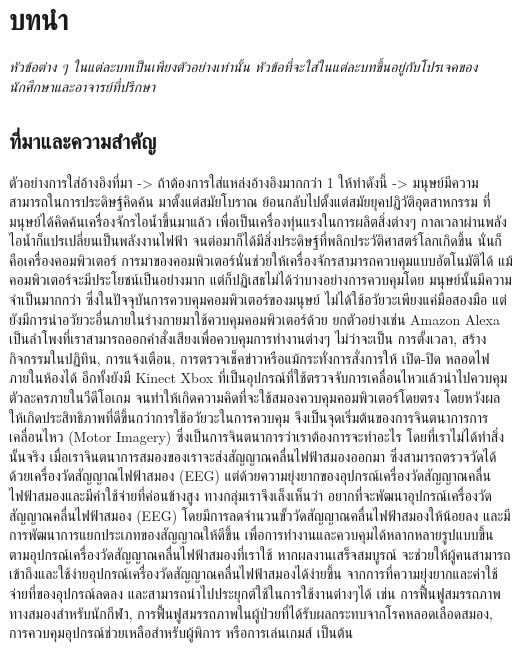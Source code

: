 \documentclass[12pt,oneside,openright,a4paper]{cpe-thai-project}
\begin{document}



\chapter{บทนำ}

\emph{หัวข้อต่าง ๆ ในแต่ละบทเป็นเพียงตัวอย่างเท่านั้น หัวข้อที่จะใส่ในแต่ละบทขึ้นอยู่กับโปรเจคของนักศึกษาและอาจารย์ที่ปรึกษา}

\section{ที่มาและความสำคัญ}

ตัวอย่างการใส่อ้างอิงที่มา -> \cite{hypersense} ถ้าต้องการใส่แหล่งอ้างอิงมากกว่า 1 ให้ทำดังนี้ -> \cite{hypersense,bworld} มนุษย์มีความสามารถในการประดิษฐ์คิดค้น มาตั้งแต่สมัยโบราณ ย้อนกลับไปตั้งแต่สมัยยุคปฏิวัติอุตสาหกรรม ที่มนุษย์ได้คิดค้นเครื่องจักรไอน้ำขึ้นมาแล้ว เพื่อเป็นเครื่องทุ่นแรงในการผลิตสิ่งต่างๆ กาลเวลาผ่านพลังไอน้ำก็แปรเปลี่ยนเป็นพลังงานไฟฟ้า จนต่อมาก็ได้มีสิ่งประดิษฐ์ที่พลิกประวัติศาสตร์โลกเกิดขึ้น นั่นก็คือเครื่องคอมพิวเตอร์ การมาของคอมพิวเตอร์นั่นช่วยให้เครื่องจักรสามารถควบคุมแบบอัตโนมัติได้ แม้คอมพิวเตอร์จะมีประโยชน์เป็นอย่างมาก แต่ก็ปฏิเสธไม่ได้ว่าบางอย่างการควบคุมโดย มนุษย์นั้นมีความจำเป็นมากกว่า ซึ่งในปัจจุบันการควบคุมคอมพิวเตอร์ของมนุษย์ ไม่ได้ใช้อวัยวะเพียงแค่มือสองมือ แต่ยังมีการนำอวัยวะอื่นภายในร่างกายมาใช้ควบคุมคอมพิวเตอร์ด้วย ยกตัวอย่างเช่น Amazon Alexa เป็นลำโพงที่เราสามารถออกคำสั่งเสียงเพื่อควบคุมการทำงานต่างๆ ไม่ว่าจะเป็น การตั้งเวลา, สร้างกิจกรรมในปฏิทิน, การแจ้งเตือน, การตรวจเช็คข่าวหรือแม้กระทั่งการสั่งการให้ เปิด-ปิด หลอดไฟภายในห้องได้ อีกทั้งยังมี Kinect Xbox ที่เป็นอุปกรณ์ที่ใช้ตรวจจับการเคลื่อนไหวแล้วนำไปควบคุมตัวละครภายในวีดีโอเกม จนทำให้เกิดความคิดที่จะใช้สมองควบคุมคอมพิวเตอร์โดยตรง โดยหวังผลให้เกิดประสิทธิภาพที่ดีขึ้นกว่าการใช้อวัยวะในการควบคุม จึงเป็นจุดเริ่มต้นของการจินตนาการการเคลื่อนไหว (Motor Imagery) ซึ่งเป็นการจินตนาการว่าเราต้องการจะทำอะไร โดยที่เราไม่ได้ทำสิ่งนั้นจริง เมื่อเราจินตนาการสมองของเราจะส่งสัญญาณคลื่นไฟฟ้าสมองออกมา ซึ่งสามารถตรวจวัดได้ด้วยเครื่องวัดสัญญาณไฟฟ้าสมอง (EEG)
แต่ด้วยความยุ่งยากของอุปกรณ์เครื่องวัดสัญญาณคลื่นไฟฟ้าสมองและมีค่าใช้จ่ายที่ค่อนข้างสูง ทางกลุ่มเราจึงเล็งเห็นว่า อยากที่จะพัฒนาอุปกรณ์เครื่องวัดสัญญาณคลื่นไฟฟ้าสมอง (EEG) โดยมีการลดจำนวนขั้ววัดสัญญาณคลื่นไฟฟ้าสมองให้น้อยลง และมีการพัฒนาการแยกประเภทของสัญญาณให้ดีขึ้น เพื่อการทำงานและควบคุมได้หลากหลายรูปแบบขึ้น ตามอุปกรณ์เครื่องวัดสัญญาณคลื่นไฟฟ้าสมองที่เราใช้ หากผลงานเสร็จสมบูรณ์ จะช่วยให้ผู้คนสามารถเข้าถึงและใช้ง่ายอุปกรณ์เครื่องวัดสัญญาณคลื่นไฟฟ้าสมองได้ง่ายขึ้น จากการที่ความยุ่งยากและค่าใช้จ่ายที่ของอุปกรณ์ลดลง และสามารถนำไปประยุกต์ใช้ในการใช้งานต่างๆได้ เช่น การฟื้นฟูสมรรถภาพทางสมองสำหรับนักกีฬา, การฟื้นฟูสมรรถภาพในผู้ป่วยที่ได้รับผลกระทบจากโรคหลอดเลือดสมอง, การควบคุมอุปกรณ์ช่วยเหลือสำหรับผู้พิการ หรือการเล่นเกมส์ เป็นต้น
%
\end{document}
